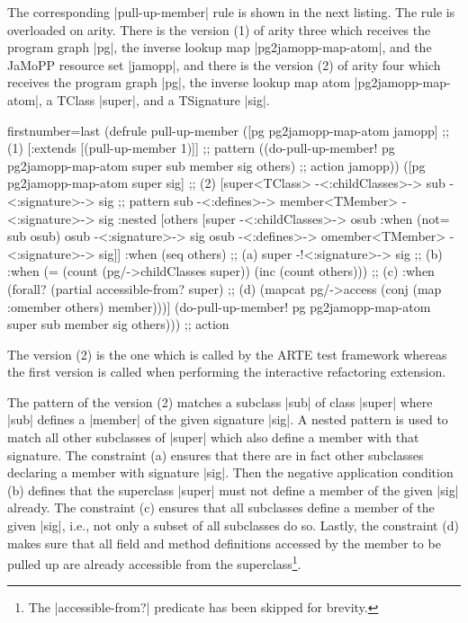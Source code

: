 \documentclass[submission]{eptcs}
\newcommand{\code}{\clojureinline}
\begin{document}
The corresponding \code|pull-up-member| rule is shown in the next listing.  The
rule is overloaded on arity.  There is the version (1) of arity three which
receives the program graph \code|pg|, the inverse lookup map
\code|pg2jamopp-map-atom|, and the JaMoPP resource set \code|jamopp|, and there
is the version (2) of arity four which receives the program graph \code|pg|,
the inverse lookup map atom \code|pg2jamopp-map-atom|, a \textsf{TClass}
\code|super|, and a \textsf{TSignature} \code|sig|.
\begin{clojurecode*}{firstnumber=last}
(defrule pull-up-member
  ([pg pg2jamopp-map-atom jamopp]                                             ;; (1)
   [:extends [(pull-up-member 1)]]                                            ;; pattern
   ((do-pull-up-member! pg pg2jamopp-map-atom super sub member sig others)    ;; action
    jamopp))
  ([pg pg2jamopp-map-atom super sig]                                          ;; (2)
   [super<TClass> -<:childClasses>-> sub -<:signature>-> sig                  ;; pattern
    sub -<:defines>-> member<TMember> -<:signature>-> sig
    :nested [others [super -<:childClasses>-> osub
                     :when (not= sub osub)
                     osub -<:signature>-> sig
                     osub -<:defines>-> omember<TMember> -<:signature>-> sig]]
    :when (seq others)                                                        ;; (a)
    super -!<:signature>-> sig                                                ;; (b)
    :when (= (count (pg/->childClasses super)) (inc (count others)))          ;; (c)
    :when (forall? (partial accessible-from? super)                           ;; (d)
                   (mapcat pg/->access (conj (map :omember others) member)))]
   (do-pull-up-member! pg pg2jamopp-map-atom super sub member sig others)))   ;; action
\end{clojurecode*}

The version (2) is the one which is called by the ARTE test framework whereas
the first version is called when performing the interactive refactoring
extension.

The pattern of the version (2) matches a subclass \code|sub| of class
\code|super| where \code|sub| defines a \code|member| of the given signature
\code|sig|.  A nested pattern is used to match all other subclasses of
\code|super| which also define a member with that signature.  The constraint
(a) ensures that there are in fact other subclasses declaring a member with
signature \code|sig|.  Then the negative application condition (b) defines that
the superclass \code|super| must not define a member of the given \code|sig|
already.  The constraint (c) ensures that all subclasses define a member of the
given \code|sig|, i.e., not only a subset of all subclasses do so.  Lastly, the
constraint (d) makes sure that all field and method definitions accessed by the
member to be pulled up are already accessible from the superclass\footnote{The
  \code|accessible-from?| predicate has been skipped for brevity.}.
\end{document}
